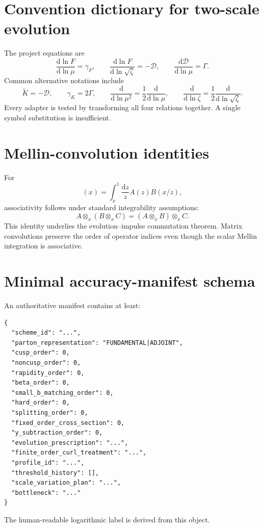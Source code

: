 \documentclass[11pt]{article}
\newcommand{\dd}{\mathrm{d}}
\newcommand{\cD}{\mathcal D}
\newcommand{\otimesx}{\mathop{\otimes}_{x}}
\begin{document}
\appendix

\section{Convention dictionary for two-scale evolution}
\label{app:conventions}

The project equations are
\begin{equation}
 \frac{\dd\ln F}{\dd\ln\mu}=\gamma_F,
 \qquad
 \frac{\dd\ln F}{\dd\ln\sqrt\zeta}=-\cD,
 \qquad
 \frac{\dd\cD}{\dd\ln\mu}=\Gamma.
 \label{eq:project-evolution-convention}
\end{equation}
Common alternative notations include
\begin{equation}
 \widetilde K=-\cD,
 \qquad
 \gamma_K=2\Gamma,
 \qquad
 \frac{\dd}{\dd\ln\mu^2}=\frac12\frac{\dd}{\dd\ln\mu},
 \qquad
 \frac{\dd}{\dd\ln\zeta}=\frac12
 \frac{\dd}{\dd\ln\sqrt\zeta}.
 \label{eq:alternative-evolution-notation}
\end{equation}
Every adapter is tested by transforming all four relations together.  A
single symbol substitution is insufficient.

\section{Mellin-convolution identities}
\label{app:mellin}

For
\begin{equation}
 [A\otimesx B](x)
 =\int_x^1\frac{\dd z}{z}A(z)B(x/z),
 \label{eq:mellin-definition}
\end{equation}
associativity follows under standard integrability assumptions:
\begin{equation}
 A\otimesx(B\otimesx C)
 =(A\otimesx B)\otimesx C.
 \label{eq:mellin-associativity}
\end{equation}
This identity underlies the evolution--impulse commutation theorem.  Matrix
convolutions preserve the order of operator indices even though the scalar
Mellin integration is associative.

\section{Minimal accuracy-manifest schema}
\label{app:accuracy-schema}

An authoritative manifest contains at least:
\begin{verbatim}
{
  "scheme_id": "...",
  "parton_representation": "FUNDAMENTAL|ADJOINT",
  "cusp_order": 0,
  "noncusp_order": 0,
  "rapidity_order": 0,
  "beta_order": 0,
  "small_b_matching_order": 0,
  "hard_order": 0,
  "splitting_order": 0,
  "fixed_order_cross_section": 0,
  "y_subtraction_order": 0,
  "evolution_prescription": "...",
  "finite_order_curl_treatment": "...",
  "profile_id": "...",
  "threshold_history": [],
  "scale_variation_plan": "...",
  "bottleneck": "..."
}
\end{verbatim}
The human-readable logarithmic label is derived from this object.
\end{document}
